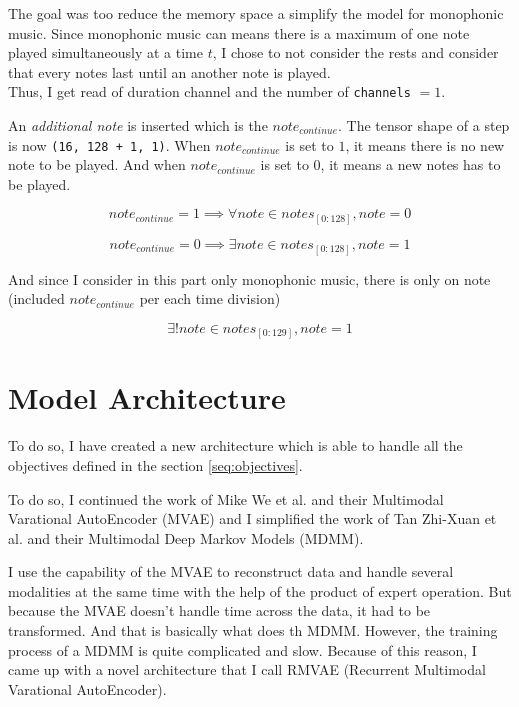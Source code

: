 \documentclass[12pt]{report}
\begin{document}
The goal was too reduce the memory space a simplify the model for monophonic music.
Since monophonic music can means there is a maximum of one note played simultaneously at a time $t$, I chose to not consider the rests and consider that every notes last until an another note is played.\\
Thus, I get read of duration channel and the number of \texttt{channels} $ = 1$.

An \textit{additional note} is inserted which is the $note_{continue}$.
The tensor shape of a step is now \texttt{(16, 128 + 1, 1)}.
When $note_{continue}$ is set to $1$, it means there is no new note to be played.
And when $note_{continue}$ is set to $0$, it means a new notes has to be played.

\begin{equation}
    note_{continue} = 1 \implies \forall note \in notes_{[0:128]}, note = 0
\end{equation}

\begin{equation}
    note_{continue} = 0 \implies \exists note \in notes_{[0:128]}, note = 1
\end{equation}

And since I consider in this part only monophonic music, there is only on note (included $note_{continue}$ per each time division)

\begin{equation}
    \exists! note \in notes_{[0:129]}, note = 1
\end{equation}


\section{Model Architecture}
\label{sec:model_architecture}

To do so, I have created a new architecture which is able to handle all the objectives defined in the section \ref{seq:objectives}.

To do so, I continued the work of Mike We et al. \cite{wu_multimodal_2018} and their Multimodal Varational AutoEncoder (MVAE) and I simplified the work of Tan Zhi-Xuan et al. \cite{tan_factorized_2019} and their Multimodal Deep Markov Models (MDMM).

I use the capability of the MVAE to reconstruct data and handle several modalities at the same time with the help of the product of expert operation.
But because the MVAE doesn't handle time across the data, it had to be transformed.
And that is basically what does th MDMM.
However, the training process of a MDMM is quite complicated and slow. Because of this reason, I came up with a novel architecture that I call RMVAE (Recurrent Multimodal Varational AutoEncoder).
\end{document}
